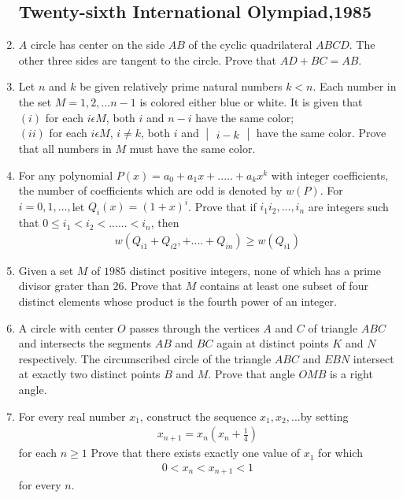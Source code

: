 \documentclass[12pt,-letter paper]{article}
\providecommand{\mydet}[1]{\ensuremath{\begin{vmatrix}#1\end{vmatrix}}}
\providecommand{\brak}[1]{\ensuremath{\left(#1\right)}}
\begin{document}
\begin{enumerate}
		\subsection*{Twenty-sixth International Olympiad,1985}
\item $A$ circle has center on the side $AB$ of the cyclic quadrilateral $ABCD$. The other three sides are tangent to the circle. Prove that $AD+BC = AB$.
\item Let  $n$ and $k$ be given relatively prime natural numbers $k<n$. Each number in the set $M={1,2,...n-1}$ is colored either blue or white. It is given that\\
	$\brak{i}$ for each $i  \epsilon   M$, both $i$ and $n-i$ have the same color;\\
		$\brak{ii}$ for each $i  \epsilon  M$, $i\neq k$, both $i$ and $\mydet {i-k}$ have the same color. Prove that all numbers in $M$ must have the same color.
	\item For any polynomial $P\brak{x} = a_0 + a_1x + ..... + a_kx^k$ with integer coefficients,  the number of coefficients which are odd is denoted by $w\brak{P}$.  For $i = 0, 1, ..., $let $Q_i\brak{x} = \brak{1+x}^i$. Prove that if $i_1i_2, ..., i_n$ are integers such
		that $0\leq i_1<i_2<......<i_n$, then \begin{align*}  w(Q_{i1}+Q_{i2},+....+Q_{in})\geq w (Q_{i1}) \end{align*}

\item Given a set $M$ of $1985$ distinct positive integers, none of which has a prime divisor grater than $26$. Prove that $M$ contains at least one subset of four distinct elements whose product is the fourth power of an integer.
\item A circle with center $O$ passes through the vertices $A$ and $C$ of triangle $ABC$ and intersects the segments $AB$ and $BC$ again at distinct points $K$ and $N$ respectively. The circumscribed circle of the triangle $ABC$ and $EBN$ intersect at exactly two distinct points $B$ and $M$. Prove that angle $OMB$ is a right angle.






\item For every real number $x_1$, construct the sequence $x_1, x_2, ... $by setting
	\begin{align*} x_{n+1}=x_n\brak{x_n+\frac{1}{4}}\end{align*} for each $n \geq 1$
Prove that there exists exactly one value of $x_1$ for which
\begin{align*}
    0 < x_n<x_{n+1}<1
\end{align*}
for every $n$.





\end{enumerate}
\end{document}
